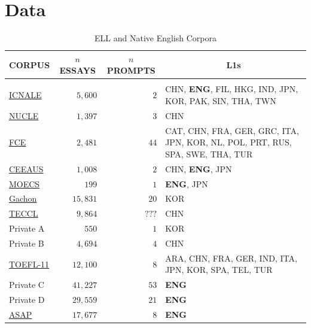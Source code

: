 \documentclass{article} %
\begin{document}
\clearpage

\appendix

\section{Data} \label{app-data}

\begin{table}[H]
\caption{ELL and Native English Corpora}
\label{data-table}
\begin{center}
\begin{tabularx}{\textwidth}{l r r X}
\multicolumn{1}{c}{\bf CORPUS} &\multicolumn{1}{c}{\bf $n$ ESSAYS} &\multicolumn{1}{c}{\bf $n$ PROMPTS} &\multicolumn{1}{c}{\bf L1s}
\\ \hline \\
\hline
\href{http://language.sakura.ne.jp/icnale/}{ICNALE} & $5,600$ & $2$ & CHN, \textbf{ENG}, FIL, HKG, IND, JPN, \newline KOR, PAK, SIN, THA, TWN \\
\href{http://www.comp.nus.edu.sg/~nlp/conll14st.html\#nucle32}{NUCLE} & $1,397$ & $3$ & CHN \\
\href{http://ilexir.co.uk/datasets/index.html}{FCE} & $2,481$ & $44$ & CAT, CHN, FRA, GER, GRC, ITA, \newline JPN, KOR, NL, POL, PRT, RUS, \newline SPA, SWE, THA, TUR \\
\href{https://meta-toolkit.org/data/2016-01-26/ceeaus.tar.gz}{CEEAUS} & $1,008$ & $2$ & CHN, \textbf{ENG}, JPN \\
\href{http://www.u-sacred-heart.ac.jp/okugiri/links/moecs/links/data/data.html}{MOECS} & $199$ & $1$ & \textbf{ENG}, JPN \\
\href{http://koreanlearnercorpusblog.blogspot.be/p/corpus.html}{Gachon} & $15,831$ & $20$ & KOR \\
\href{http://www.bfsu-corpus.org/static/corpora/TECCL_Corpus_V1.1.zip}{TECCL} & $9,864$ & $???$ & CHN \\
Private A & $550$ & $1$ & KOR \\
Private B & $4,694$ & $4$ & CHN \\
\href{https://catalog.ldc.upenn.edu/LDC2014T06}{TOEFL-11} & $12,100$ & $8$ & ARA, CHN, FRA, GER, IND, ITA, \newline JPN, KOR, SPA, TEL, TUR \\
Private C & $41,227$ & $53$ & \textbf{ENG} \\
Private D & $29,559$ & $21$ & \textbf{ENG} \\
\href{https://www.kaggle.com/c/asap-aes/data}{ASAP} & $17,677$ & $8$ & \textbf{ENG} \\
\end{tabularx}
\end{center}
\end{table}
\end{document}
